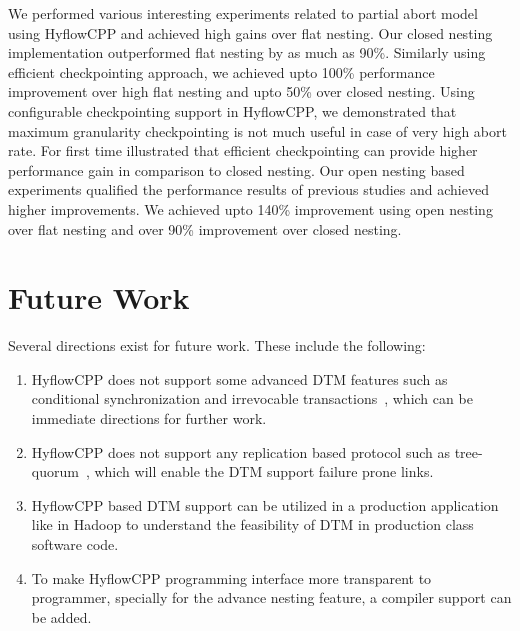 \documentclass[12pt,english]{report}
\begin{document}
We performed various interesting experiments related to partial abort model using HyflowCPP and achieved high  gains over flat nesting. Our closed nesting implementation outperformed flat nesting by as much as 90\%. Similarly using efficient checkpointing approach, we achieved upto 100\% performance improvement over high flat nesting and upto 50\% over closed nesting. Using configurable checkpointing support in HyflowCPP, we demonstrated that maximum granularity checkpointing is not much useful in case of very high abort rate. For first time illustrated that efficient checkpointing can provide higher performance gain in comparison to closed nesting. Our open nesting based experiments qualified the performance results of previous studies and achieved higher improvements. We achieved upto 140\% improvement using open nesting over flat nesting and over 90\% improvement over closed nesting. 



\section{Future Work}

Several directions exist for future work. These include the following:

\begin{enumerate}
\item HyflowCPP does not support some advanced DTM features such as conditional synchronization and 
irrevocable transactions~\cite{welc2008irrevocable}, which can be immediate directions for further work.
\item HyflowCPP does not support any replication based protocol such as tree-quorum~\cite{Zhang:2011:QRF:2183536.2183539}, which will enable the DTM support failure prone links.
\item HyflowCPP based DTM support can be utilized in a production application like in Hadoop to understand the feasibility of DTM in production class software code.
\item To make HyflowCPP programming interface more transparent to programmer, specially for the advance nesting feature, a compiler support can be added. 
\end{enumerate}

\newpage
{}



\end{document}
